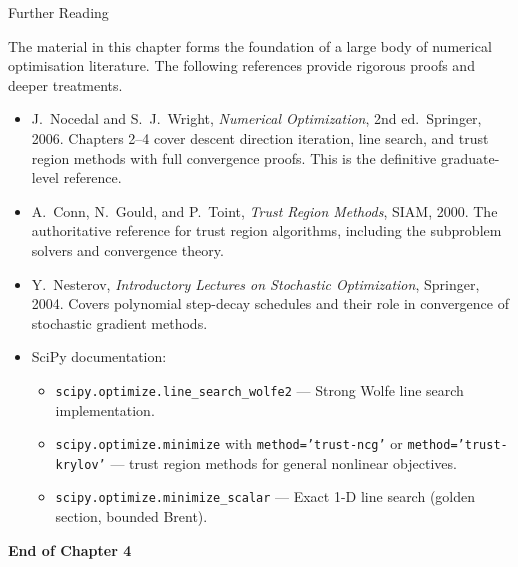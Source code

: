 \documentclass[aspectratio=169,10pt]{beamer}
\begin{document}
\begin{frame}[allowframebreaks]{Further Reading}

  The material in this chapter forms the foundation of a large body
  of numerical optimisation literature.  The following references
  provide rigorous proofs and deeper treatments.

  \begin{itemize}
    \item J.\ Nocedal and S.\ J.\ Wright,
          \textit{Numerical Optimization}, 2nd ed.\ Springer, 2006.
          Chapters 2--4 cover descent direction iteration, line search,
          and trust region methods with full convergence proofs.
          This is the definitive graduate-level reference.

    \item A.\ Conn, N.\ Gould, and P.\ Toint,
          \textit{Trust Region Methods}, SIAM, 2000.
          The authoritative reference for trust region algorithms,
          including the subproblem solvers and convergence theory.

    \item Y.\ Nesterov,
          \textit{Introductory Lectures on Stochastic Optimization},
          Springer, 2004.  Covers polynomial step-decay schedules and
          their role in convergence of stochastic gradient methods.

    \item SciPy documentation:
          \begin{itemize}
            \item \texttt{scipy.optimize.line\_search\_wolfe2} ---
                  Strong Wolfe line search implementation.
            \item \texttt{scipy.optimize.minimize} with
                  \texttt{method='trust-ncg'} or
                  \texttt{method='trust-krylov'} --- trust region
                  methods for general nonlinear objectives.
            \item \texttt{scipy.optimize.minimize\_scalar} ---
                  Exact 1-D line search (golden section, bounded
                  Brent).
          \end{itemize}
  \end{itemize}

  \vspace{1em}
  \begin{center}
    \Large\textbf{End of Chapter 4}
  \end{center}

\end{frame}
\end{document}
